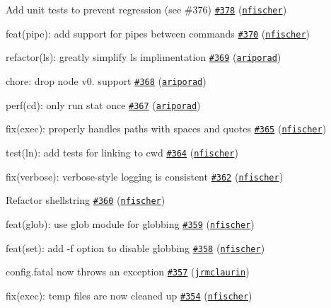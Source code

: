\begin{DoxyItemize}
\item Add unit tests to prevent regression (see \#376) \href{https://github.com/shelljs/shelljs/pull/378}{\tt \#378} (\href{https://github.com/nfischer}{\tt nfischer})
\item feat(pipe)\+: add support for pipes between commands \href{https://github.com/shelljs/shelljs/pull/370}{\tt \#370} (\href{https://github.com/nfischer}{\tt nfischer})
\item refactor(ls)\+: greatly simplify ls implimentation \href{https://github.com/shelljs/shelljs/pull/369}{\tt \#369} (\href{https://github.com/ariporad}{\tt ariporad})
\item chore\+: drop node v0. support \href{https://github.com/shelljs/shelljs/pull/368}{\tt \#368} (\href{https://github.com/ariporad}{\tt ariporad})
\item perf(cd)\+: only run {\ttfamily stat} once \href{https://github.com/shelljs/shelljs/pull/367}{\tt \#367} (\href{https://github.com/ariporad}{\tt ariporad})
\item fix(exec)\+: properly handles paths with spaces and quotes \href{https://github.com/shelljs/shelljs/pull/365}{\tt \#365} (\href{https://github.com/nfischer}{\tt nfischer})
\item test(ln)\+: add tests for linking to cwd \href{https://github.com/shelljs/shelljs/pull/364}{\tt \#364} (\href{https://github.com/nfischer}{\tt nfischer})
\item fix(verbose)\+: verbose-\/style logging is consistent \href{https://github.com/shelljs/shelljs/pull/362}{\tt \#362} (\href{https://github.com/nfischer}{\tt nfischer})
\item Refactor shellstring \href{https://github.com/shelljs/shelljs/pull/360}{\tt \#360} (\href{https://github.com/nfischer}{\tt nfischer})
\item feat(glob)\+: use glob module for globbing \href{https://github.com/shelljs/shelljs/pull/359}{\tt \#359} (\href{https://github.com/nfischer}{\tt nfischer})
\item feat(set)\+: add -\/f option to disable globbing \href{https://github.com/shelljs/shelljs/pull/358}{\tt \#358} (\href{https://github.com/nfischer}{\tt nfischer})
\item config.\+fatal now throws an exception \href{https://github.com/shelljs/shelljs/pull/357}{\tt \#357} (\href{https://github.com/jrmclaurin}{\tt jrmclaurin})
\item fix(exec)\+: temp files are now cleaned up \href{https://github.com/shelljs/shelljs/pull/354}{\tt \#354} (\href{https://github.com/nfischer}{\tt nfischer})

\end{DoxyItemize}
